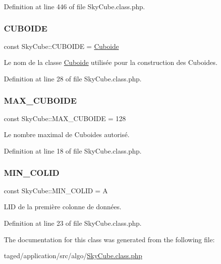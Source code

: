 Definition at line 446 of file Sky\+Cube.\+class.\+php.

\mbox{\label{class_sky_cube_a30dbde9937a3942ea12ad1cd2b9740a0}} 
\subsubsection{\texorpdfstring{C\+U\+B\+O\+I\+DE}{CUBOIDE}}
{\footnotesize\ttfamily const Sky\+Cube\+::\+C\+U\+B\+O\+I\+DE = \textquotesingle{}\hyperlink{class_cuboide}{Cuboide}\textquotesingle{}}

Le nom de la classe \hyperlink{class_cuboide}{Cuboide} utilisée pour la construction des Cuboides. 

Definition at line 28 of file Sky\+Cube.\+class.\+php.

\mbox{\label{class_sky_cube_a7379f6cb471bafe6208e7c82bd19eafb}} 
\subsubsection{\texorpdfstring{M\+A\+X\+\_\+\+C\+U\+B\+O\+I\+DE}{MAX\_CUBOIDE}}
{\footnotesize\ttfamily const Sky\+Cube\+::\+M\+A\+X\+\_\+\+C\+U\+B\+O\+I\+DE = 128}

Le nombre maximal de Cuboides autorisé. 

Definition at line 18 of file Sky\+Cube.\+class.\+php.

\mbox{\label{class_sky_cube_a02a81cad7f2521e515a4f7574d2899ae}} 
\subsubsection{\texorpdfstring{M\+I\+N\+\_\+\+C\+O\+L\+ID}{MIN\_COLID}}
{\footnotesize\ttfamily const Sky\+Cube\+::\+M\+I\+N\+\_\+\+C\+O\+L\+ID = \textquotesingle{}A\textquotesingle{}}

L\textquotesingle{}ID de la première colonne de données. 

Definition at line 23 of file Sky\+Cube.\+class.\+php.



The documentation for this class was generated from the following file\+:\begin{DoxyCompactItemize}
\item 
taged/application/src/algo/\hyperlink{_sky_cube_8class_8php}{Sky\+Cube.\+class.\+php}\end{DoxyCompactItemize}
